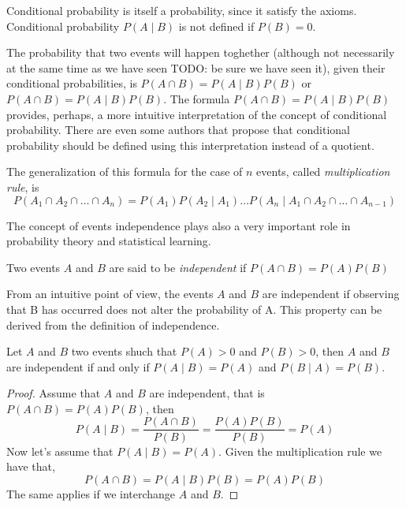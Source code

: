 Conditional probability is itself a probability, since it satisfy the axioms. Conditional probability $P\left(A\mid B\right)$ is not defined if $P\left(B\right)=0$.

The probability that two events will happen toghether (although not necessarily at the same time as we have seen {\color{red} TODO: be sure we have seen it}), given their conditional probabilities, is $P \left( A \cap B \right) = P \left( A \mid B \right) P \left( B \right)$ or $P \left( A \cap B \right) = P \left( A \mid B \right) P \left( B \right)$. The formula $P \left( A \cap B \right) = P \left( A \mid B \right) P \left( B \right)$ provides, perhaps, a more intuitive interpretation of the concept of conditional probability. There are even some authors that propose that conditional probability should be defined using this interpretation instead of a quotient.

The generalization of this formula for the case of $n$ events, called \emph{multiplication rule}, is
\[
P \left( A_{1} \cap A_{2} \cap \ldots \cap A_{n} \right) = P \left( A_{1} \right) P \left( A_{2} \mid A_{1}\right) \ldots  P \left( A_{n} \mid A_{1}\cap A_{2} \cap \ldots \cap A_{n-1} \right)
\]

The concept of events independence plays also a very important role in probability theory and statistical learning. 

\begin{definition}\label{independent_events}
Two events $A$ and $B$ are said to be \emph{independent} if $P \left( A \cap B \right) = P \left( A \right) P \left(B \right)$
\end{definition}

From an intuitive point of view, the events $A$ and $B$ are independent if observing that B has occurred does not alter the probability of A. This property can be derived from the definition of independence.

\begin{proposition}
Let $A$ and $B$ two events shuch that $P \left( A \right) > 0$ and $P \left( B \right)>0$, then $A$ and $B$ are independent if and only if $P \left( A \mid B\right) = P \left( A \right)$ and $P \left( B \mid  A \right) = P \left( B \right)$.
\end{proposition}
\begin{proof}
Assume that $A$ and $B$ are independent, that is $P \left( A \cap B \right) = P \left( A \right) P \left(B \right)$, then
\[
P \left( A \mid B \right) = \frac{P\left(A\cap B\right)}{P\left(B\right)} = \frac{P \left( A \right) P \left(B \right)}{P\left(B\right)} = P \left( A \right)
\]
Now let's assume that $P \left( A \mid B \right) = P \left( A \right)$. Given the multiplication rule we have that,
\[
P \left( A \cap B \right) =  P \left( A \mid B \right) P \left( B \right) = P \left( A \right) P \left( B \right)
\] 
The same applies if we interchange $A$ and $B$. 
\end{proof}

